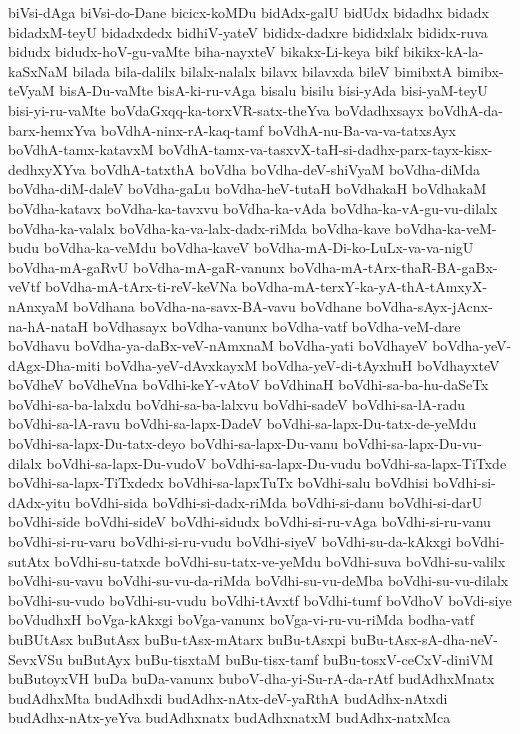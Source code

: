 {biVsi-dAga
biVsi-do-Dane
bicicx-koMDu
bidAdx-galU
bidUdx
bidadhx
bidadx
bidadxM-teyU
bidadxdedx
bidhiV-yateV
bididx-dadxre
bididxlalx
bididx-ruva
bidudx
bidudx-hoV-gu-vaMte
biha-nayxteV
bikakx-Li-keya
bikf
bikikx-kA-la-kaSxNaM
bilada
bila-dalilx
bilalx-nalalx
bilavx
bilavxda
bileV
bimibxtA
bimibx-teVyaM
bisA-Du-vaMte
bisA-ki-ru-vAga
bisalu
bisilu
bisi-yAda
bisi-yaM-teyU
bisi-yi-ru-vaMte
boVdaGxqq-ka-torxVR-satx-theYva
boVdadhxsayx
boVdhA-da-barx-hemxYva
boVdhA-ninx-rA-kaq-tamf
boVdhA-nu-Ba-va-va-tatxsAyx
boVdhA-tamx-katavxM
boVdhA-tamx-va-tasxvX-taH-si-dadhx-parx-tayx-kisx-dedhxyXYva
boVdhA-tatxthA
boVdha
boVdha-deV-shiVyaM
boVdha-diMda
boVdha-diM-daleV
boVdha-gaLu
boVdha-heV-tutaH
boVdhakaH
boVdhakaM
boVdha-katavx
boVdha-ka-tavxvu
boVdha-ka-vAda
boVdha-ka-vA-gu-vu-dilalx
boVdha-ka-valalx
boVdha-ka-va-lalx-dadx-riMda
boVdha-kave
boVdha-ka-veM-budu
boVdha-ka-veMdu
boVdha-kaveV
boVdha-mA-Di-ko-LuLx-va-va-nigU
boVdha-mA-gaRvU
boVdha-mA-gaR-vanunx
boVdha-mA-tArx-thaR-BA-gaBx-veVtf
boVdha-mA-tArx-ti-reV-keVNa
boVdha-mA-terxY-ka-yA-thA-tAmxyX-nAnxyaM
boVdhana
boVdha-na-savx-BA-vavu
boVdhane
boVdha-sAyx-jAcnx-na-hA-nataH
boVdhasayx
boVdha-vanunx
boVdha-vatf
boVdha-veM-dare
boVdhavu
boVdha-ya-daBx-veV-nAmxnaM
boVdha-yati
boVdhayeV
boVdha-yeV-dAgx-Dha-miti
boVdha-yeV-dAvxkayxM
boVdha-yeV-di-tAyxhuH
boVdhayxteV
boVdheV
boVdheVna
boVdhi-keY-vAtoV
boVdhinaH
boVdhi-sa-ba-hu-daSeTx
boVdhi-sa-ba-lalxdu
boVdhi-sa-ba-lalxvu
boVdhi-sadeV
boVdhi-sa-lA-radu
boVdhi-sa-lA-ravu
boVdhi-sa-lapx-DadeV
boVdhi-sa-lapx-Du-tatx-de-yeMdu
boVdhi-sa-lapx-Du-tatx-deyo
boVdhi-sa-lapx-Du-vanu
boVdhi-sa-lapx-Du-vu-dilalx
boVdhi-sa-lapx-Du-vudoV
boVdhi-sa-lapx-Du-vudu
boVdhi-sa-lapx-TiTxde
boVdhi-sa-lapx-TiTxdedx
boVdhi-sa-lapxTuTx
boVdhi-salu
boVdhisi
boVdhi-si-dAdx-yitu
boVdhi-sida
boVdhi-si-dadx-riMda
boVdhi-si-danu
boVdhi-si-darU
boVdhi-side
boVdhi-sideV
boVdhi-sidudx
boVdhi-si-ru-vAga
boVdhi-si-ru-vanu
boVdhi-si-ru-varu
boVdhi-si-ru-vudu
boVdhi-siyeV
boVdhi-su-da-kAkxgi
boVdhi-sutAtx
boVdhi-su-tatxde
boVdhi-su-tatx-ve-yeMdu
boVdhi-suva
boVdhi-su-valilx
boVdhi-su-vavu
boVdhi-su-vu-da-riMda
boVdhi-su-vu-deMba
boVdhi-su-vu-dilalx
boVdhi-su-vudo
boVdhi-su-vudu
boVdhi-tAvxtf
boVdhi-tumf
boVdhoV
boVdi-siye
boVdudhxH
boVga-kAkxgi
boVga-vanunx
boVga-vi-ru-vu-riMda
bodha-vatf
buBUtAsx
buButAsx
buBu-tAsx-mAtarx
buBu-tAsxpi
buBu-tAsx-sA-dha-neV-SevxVSu
buButAyx
buBu-tisxtaM
buBu-tisx-tamf
buBu-tosxV-ceCxV-diniVM
buButoyxVH
buDa
buDa-vanunx
buboV-dha-yi-Su-rA-da-rAtf
budAdhxMnatx
budAdhxMta
budAdhxdi
budAdhx-nAtx-deV-yaRthA
budAdhx-nAtxdi
budAdhx-nAtx-yeYva
budAdhxnatx
budAdhxnatxM
budAdhx-natxMca
}
